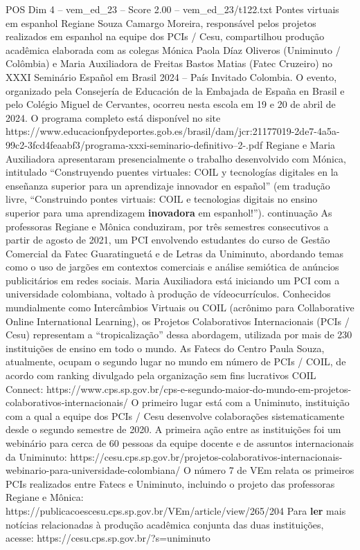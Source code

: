 \begin{textsample}{POS Dim 4 – vem\_ed\_23 – Score 2.00 – vem\_ed\_23/t122.txt}  \label{ex:f4_pos_092}
Pontes virtuais em espanhol Regiane Souza Camargo Moreira, responsável pelos projetos realizados em espanhol na equipe dos PCIs / Cesu, compartilhou produção acadêmica elaborada com as colegas Mónica Paola Díaz Oliveros (Uniminuto / Colômbia) e Maria Auxiliadora de Freitas Bastos Matias (Fatec Cruzeiro) no XXXI Seminário Español em Brasil 2024 – País Invitado Colombia.
O evento, organizado pela Consejería de Educación de la Embajada de España en Brasil e pelo Colégio Miguel de Cervantes, ocorreu nesta escola em 19 e 20 de abril de 2024.
O programa completo está disponível no site https://www.educacionfpydeportes.gob.es/brasil/dam/jcr:21177019-2de7-4a5a-99c2-3fcd4feaabf3/programa-xxxi-seminario-definitivo--2-.pdf Regiane e Maria Auxiliadora apresentaram presencialmente o trabalho desenvolvido com Mónica, intitulado “Construyendo puentes virtuales: COIL y tecnologías digitales en la enseñanza superior para un aprendizaje innovador en español” (em tradução livre, “Construindo pontes virtuais: COIL e tecnologias digitais no ensino superior para uma aprendizagem \textbf{inovadora} em espanhol!”). continuação As professoras Regiane e Mônica conduziram, por três semestres consecutivos a partir de agosto de 2021, um PCI envolvendo estudantes do curso de Gestão Comercial da Fatec Guaratinguetá e de Letras da Uniminuto, abordando temas como o uso de jargões em contextos comerciais e análise semiótica de anúncios publicitários em redes sociais.
Maria Auxiliadora está iniciando um PCI com a universidade colombiana, voltado à produção de vídeocurrículos.
Conhecidos mundialmente como Intercâmbios Virtuais ou COIL (acrônimo para Collaborative Online International Learning), os Projetos Colaborativos Internacionais (PCIs / Cesu) representam a “tropicalização” dessa abordagem, utilizada por mais de 230 instituições de ensino em todo o mundo.
As Fatecs do Centro Paula Souza, atualmente, ocupam o segundo lugar no mundo em número de PCIs / COIL, de acordo com ranking divulgado pela organização sem fins lucrativos COIL Connect: https://www.cps.sp.gov.br/cps-e-segundo-maior-do-mundo-em-projetos-colaborativos-internacionais/ O primeiro lugar está com a Uniminuto, instituição com a qual a equipe dos PCIs / Cesu desenvolve colaborações sistematicamente desde o segundo semestre de 2020.
A primeira ação entre as instituições foi um webinário para cerca de 60 pessoas da equipe docente e de assuntos internacionais da Uniminuto: https://cesu.cps.sp.gov.br/projetos-colaborativos-internacionais-webinario-para-universidade-colombiana/ O número 7 de VEm relata os primeiros PCIs realizados entre Fatecs e Uniminuto, incluindo o projeto das professoras Regiane e Mônica: https://publicacoescesu.cps.sp.gov.br/VEm/article/view/265/204 Para \textbf{ler} mais notícias relacionadas à produção acadêmica conjunta das duas instituições, acesse: https://cesu.cps.sp.gov.br/?s=uniminuto

\end{textsample}
